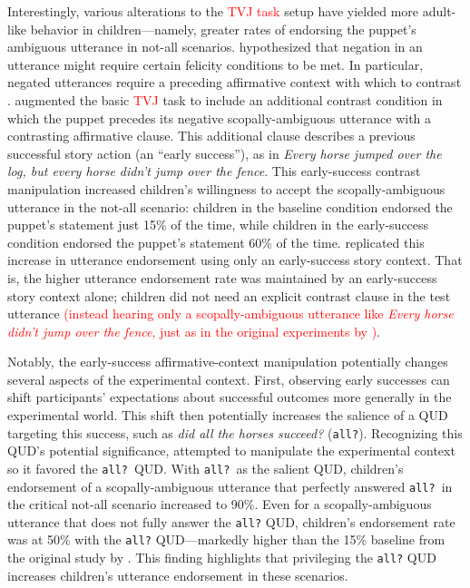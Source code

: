\documentclass[preprint,authoryear]{elsarticle}\frenchspacing
\newcommand{\lp}[1]{\textcolor{red}{#1}} %
\begin{document}
Interestingly, various alterations to the %
\lp{TVJ task}
setup have yielded more adult-like behavior in children---namely, greater rates of endorsing the puppet's ambiguous utterance in not-all scenarios. \cite{musolinolidz2006} hypothesized that negation in an utterance might require certain felicity conditions to be met. In particular, negated utterances require a preceding affirmative context with which to contrast \citep{wason1965contexts}.  \citeauthor{musolinolidz2006} augmented the basic %
\lp{TVJ}
task to include an additional contrast condition in which the puppet precedes its negative scopally-ambiguous utterance with a contrasting affirmative clause. This additional clause describes a previous successful story action (an ``early success''),  as in \textit{Every horse jumped over the log, but every horse didn't jump over the fence}. This early-success contrast manipulation increased children's willingness to accept the scopally-ambiguous utterance in the {not-all} scenario: children in the baseline condition endorsed the puppet's statement just 15\% of the time, while children in the early-success condition endorsed the puppet's statement 60\% of the time. \cite{viauetal2010} replicated this increase in utterance endorsement using only an early-success story context. That is, the higher utterance endorsement rate was maintained by an early-success story context alone; children did not need an explicit contrast clause in the test utterance 
\lp{(instead hearing only a scopally-ambiguous utterance like \textit{Every horse didn't jump over the fence}, just as in the original experiments by \citeauthor{musolinolidz2006})}.

Notably, the early-success affirmative-context manipulation  potentially changes several aspects of the experimental context.  First, observing early successes can shift participants' expectations about successful outcomes more generally in the experimental world. This shift then potentially increases the salience of a QUD targeting this success, such as \textit{did all the horses succeed?} (\texttt{all?}). Recognizing this QUD's potential significance, \cite{gualmini2004some} attempted to manipulate the experimental context so it favored the \texttt{all?}~QUD. With \texttt{all?}~as the salient QUD, children's endorsement of a scopally-ambiguous utterance that perfectly answered \texttt{all?}~in the critical not-all scenario increased to 90\%.  Even for a scopally-ambiguous utterance that does not fully answer the \texttt{all?} QUD, children's endorsement rate was at 50\% with the \texttt{all?} QUD---markedly higher than the 15\% baseline from the original study by \cite{musolinolidz2006}. This finding highlights that privileging the \texttt{all?} QUD increases children's utterance endorsement in these scenarios.
 
\end{document}
